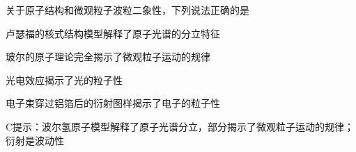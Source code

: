 关于原子结构和微观粒子波粒二象性，下列说法正确的是\paren[]
\begin{choices}
	\item 卢瑟福的核式结构模型解释了原子光谱的分立特征
	\item 玻尔的原子理论完全揭示了微观粒子运动的规律
	\item 光电效应揭示了光的粒子性
	\item 电子束穿过铝箔后的衍射图样揭示了电子的粒子性
\end{choices}
\begin{answer}
	C\qquad 提示：波尔氢原子模型解释了原子光谱分立，部分揭示了微观粒子运动的规律；衍射是波动性
\end{answer}